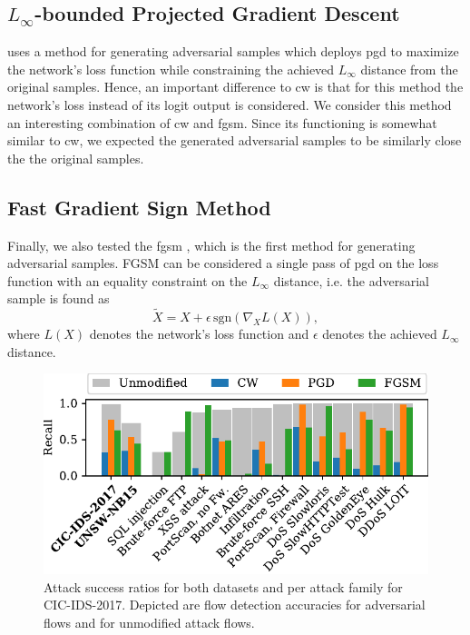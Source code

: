 \documentclass[conference]{IEEEtran}
\begin{document}
\subsection{$L_\infty$-bounded Projected Gradient Descent}
\cite{madry_towards_2018} uses a method for generating adversarial samples which deploys \gls{pgd}  to maximize the network's loss function while constraining the achieved $L_\infty$ distance from the original samples. Hence, an important difference to \gls{cw} is that for this method the network's loss instead of its logit output is considered.
We consider this method an interesting combination of \gls{cw} and \gls{fgsm}.
Since its functioning is somewhat similar to \gls{cw}, we expected the generated adversarial samples to be similarly close the the original samples.

\subsection{Fast Gradient Sign Method}
Finally, we also tested the \gls{fgsm} %
 \cite{goodfellow_explaining_2015}, which is the first method for generating adversarial samples. FGSM can be considered a single pass of \gls{pgd} on the loss function with an equality constraint on the $L_\infty$ distance, i.e. the adversarial sample is found as
\begin{equation}
\tilde X = X + \epsilon \, \text{sgn}( \nabla_X L(X)),
\end{equation}
where $L(X)$ denotes the network's loss function and $\epsilon$ denotes the achieved $L_\infty$ distance.

\begin{figure}[h]
\includegraphics[width=\columnwidth]{../plots/adv_comparison/adv_comparison_17.pdf}
\caption{Attack success ratios for both datasets and per attack family for CIC-IDS-2017. Depicted are flow detection accuracies for adversarial flows and for unmodified attack flows.}
\label{fig:adv_per_family}
\end{figure}
\end{document}
